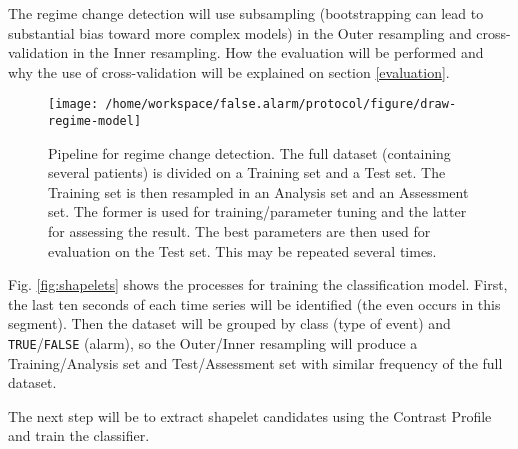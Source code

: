\documentclass[12pt,twoside]{fmupthesis}
\begin{document}
The regime change detection will use subsampling (bootstrapping can lead to substantial bias toward
more complex models) in the Outer resampling and cross-validation in the Inner resampling. How
the evaluation will be performed and why the use of cross-validation will be explained on section
\ref{evaluation}.
\begin{figure}

{\centering \texttt{[image: /home/workspace/false.alarm/protocol/figure/draw-regime-model]} 

}

\caption{Pipeline for regime change detection. The full dataset (containing several patients) is divided on a Training set and a Test set. The Training set is then resampled in an Analysis set and an Assessment set. The former is used for training/parameter tuning and the latter for assessing the result. The best parameters are then used for evaluation on the Test set. This may be repeated several times.}\label{fig:regimedetection}
\end{figure}
Fig. \ref{fig:shapelets} shows the processes for training the classification model. First, the last
ten seconds of each time series will be identified (the even occurs in this segment). Then the
dataset will be grouped by class (type of event) and \texttt{TRUE}/\texttt{FALSE} (alarm), so the Outer/Inner
resampling will produce a Training/Analysis set and Test/Assessment set with similar frequency of
the full dataset.

The next step will be to extract shapelet candidates using the Contrast Profile and train the
classifier.
\end{document}
